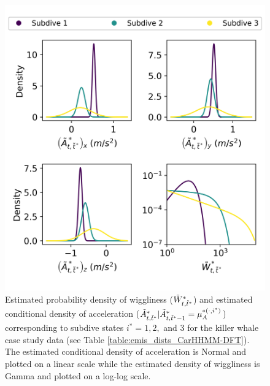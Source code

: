 \begin{figure}[ht]
	\centering
	\includegraphics[width=5in]{../Plots/CarHHMM2-fine-emissions.png}
	\caption{Estimated probability density of wiggliness ($\tilde{W}^*_{t,\tilde t^*}$) and estimated conditional density of acceleration ($\tilde{A}^*_{t,\tilde t^*}|\tilde{A}^*_{t,\tilde t^*-1} = \mu_A^{*(\cdot,i^*)}$) corresponding to subdive states $i^* = 1,2,$ and $3$ for the killer whale case study data (see Table \ref{table:emis_dists_CarHHMM-DFT}). The estimated conditional density of acceleration is Normal and plotted on a linear scale while the estimated density of wiggliness is Gamma and plotted on a log-log scale.}
	\label{fig:fine_emis}
\end{figure}


